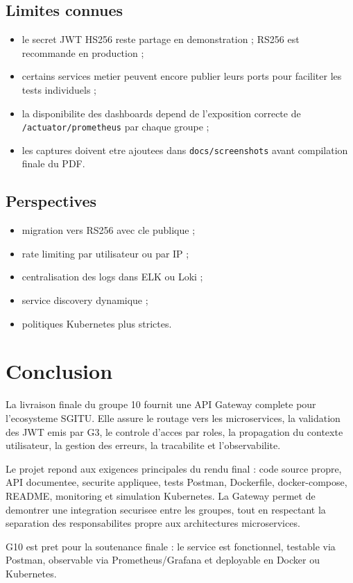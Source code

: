 \documentclass[12pt,a4paper]{article}
\begin{document}
\subsection{Limites connues}

\begin{itemize}
  \item le secret JWT HS256 reste partage en demonstration ; RS256 est recommande en production ;
  \item certains services metier peuvent encore publier leurs ports pour faciliter les tests individuels ;
  \item la disponibilite des dashboards depend de l'exposition correcte de \texttt{/actuator/prometheus} par chaque groupe ;
  \item les captures doivent etre ajoutees dans \texttt{docs/screenshots} avant compilation finale du PDF.
\end{itemize}

\subsection{Perspectives}

\begin{itemize}
  \item migration vers RS256 avec cle publique ;
  \item rate limiting par utilisateur ou par IP ;
  \item centralisation des logs dans ELK ou Loki ;
  \item service discovery dynamique ;
  \item politiques Kubernetes plus strictes.
\end{itemize}

\newpage

\section{Conclusion}

La livraison finale du groupe 10 fournit une API Gateway complete pour l'ecosysteme SGITU. Elle assure le routage vers les microservices, la validation des JWT emis par G3, le controle d'acces par roles, la propagation du contexte utilisateur, la gestion des erreurs, la tracabilite et l'observabilite.

Le projet repond aux exigences principales du rendu final : code source propre, API documentee, securite appliquee, tests Postman, Dockerfile, docker-compose, README, monitoring et simulation Kubernetes. La Gateway permet de demontrer une integration securisee entre les groupes, tout en respectant la separation des responsabilites propre aux architectures microservices.

\begin{successBox}
G10 est pret pour la soutenance finale : le service est fonctionnel, testable via Postman, observable via Prometheus/Grafana et deployable en Docker ou Kubernetes.
\end{successBox}
\end{document}
